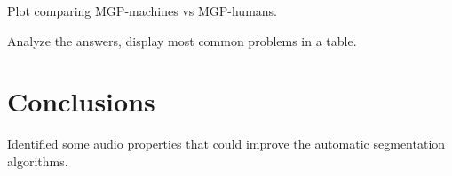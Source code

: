 \documentclass{article}
\begin{document}
Plot comparing MGP-machines vs MGP-humans.

Analyze the answers, display most common problems in a table.



\section{Conclusions}

Identified some audio properties that could improve the automatic segmentation algorithms.







\small

\end{document}

